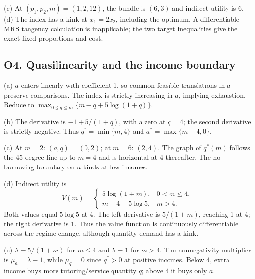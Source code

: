 (c) At $(p_1,p_2,m)=(1,2,12)$, the bundle is $(6,3)$ and indirect utility is 6. (d) The index has a kink at $x_1=2x_2$, including the optimum. A differentiable MRS tangency calculation is inapplicable; the two target inequalities give the exact fixed proportions and cost. 
\subsection*{O4. Quasilinearity and the income boundary}
(a) $a$ enters linearly with coefficient 1, so common feasible translations in $a$ preserve comparisons. The index is strictly increasing in $a$, implying exhaustion. Reduce to $\max_{0\le q\le m}\{m-q+5\log(1+q)\}$.

(b) The derivative is $-1+5/(1+q)$, with a zero at $q=4$; the second derivative is strictly negative. Thus $q^*=\min\{m,4\}$ and $a^*=\max\{m-4,0\}$.

(c) At $m=2$: $(a,q)=(0,2)$; at $m=6$: $(2,4)$. The graph of $q^*(m)$ follows the 45-degree line up to $m=4$ and is horizontal at 4 thereafter. The no-borrowing boundary on $a$ binds at low incomes.

(d) Indirect utility is
\[
 V(m)=\begin{cases}5\log(1+m),&0<m\le4,\\m-4+5\log5,&m>4.\end{cases}
\]
Both values equal $5\log5$ at 4. The left derivative is $5/(1+m)$, reaching 1 at 4; the right derivative is 1. Thus the value function is continuously differentiable across the regime change, although quantity demand has a kink.

(e) $\lambda=5/(1+m)$ for $m\le4$ and $\lambda=1$ for $m>4$. The nonnegativity multiplier is $\mu_a=\lambda-1$, while $\mu_q=0$ since $q^*>0$ at positive incomes. Below 4, extra income buys more tutoring/service quantity $q$; above 4 it buys only $a$. 
